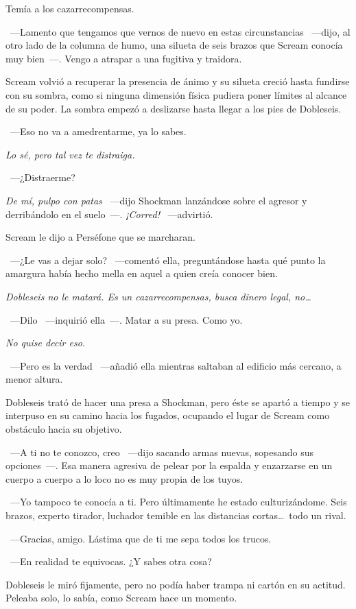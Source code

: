 Temía a los cazarrecompensas.

~---Lamento que tengamos que vernos de nuevo en estas circunstancias ~---dijo, al otro lado de la columna de humo, una silueta de seis brazos que Scream conocía muy bien~---. Vengo a atrapar a una fugitiva y traidora.

Scream volvió a recuperar la presencia de ánimo y su silueta creció hasta fundirse con su sombra, como si ninguna dimensión física pudiera poner límites al alcance de su poder. La sombra empezó a deslizarse hasta llegar a los pies de Dobleseis.

~---Eso no va a amedrentarme, ya lo sabes.

\emph{Lo sé, pero tal vez te distraiga.}

~---¿Distraerme?

\emph{De mí, pulpo con patas} ~---dijo Shockman lanzándose sobre el agresor y derribándolo en el suelo~---. \emph{¡Corred!} ~---advirtió.

Scream le dijo a Perséfone que se marcharan.

~---¿Le vas a dejar solo? ~---comentó ella, preguntándose hasta qué punto la amargura había hecho mella en aquel a quien creía conocer bien.

\emph{Dobleseis no le matará. Es un cazarrecompensas, busca dinero legal, no\dots}

~---Dilo ~---inquirió ella~---. Matar a su presa. Como yo.

\emph{No quise decir eso.}

~---Pero es la verdad ~---añadió ella mientras saltaban al edificio más cercano, a menor altura.

Dobleseis trató de hacer una presa a Shockman, pero éste se apartó a tiempo y se interpuso en su camino hacia los fugados, ocupando el lugar de Scream como obstáculo hacia su objetivo.

~---A ti no te conozco, creo ~---dijo sacando armas nuevas, sopesando sus opciones~---. Esa manera agresiva de pelear por la espalda y enzarzarse en un cuerpo a cuerpo a lo loco no es muy propia de los tuyos.

~---Yo tampoco te conocía a ti. Pero últimamente he estado culturizándome. Seis brazos, experto tirador, luchador temible en las distancias cortas\dots\ todo un rival.

~---Gracias, amigo. Lástima que de ti me sepa todos los trucos.

~---En realidad te equivocas. ¿Y sabes otra cosa?

Dobleseis le miró fijamente, pero no podía haber trampa ni cartón en su actitud. Peleaba solo, lo sabía, como Scream hace un momento.

